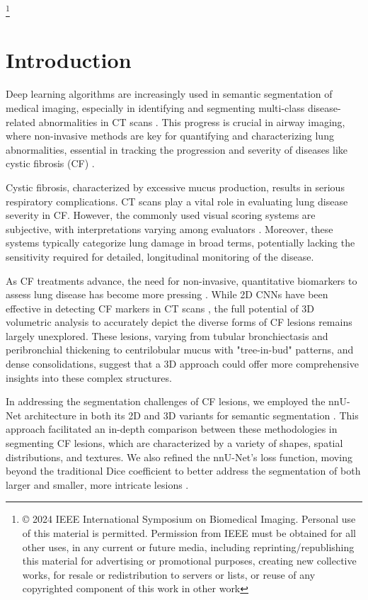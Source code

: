 \documentclass{article}
\newcommand\blfootnote[1]{%
  \begingroup
  \renewcommand\thefootnote{}\footnote{#1}%
  \addtocounter{footnote}{-1}%
  \endgroup
}
\begin{document}
\blfootnote{© 2024 IEEE International Symposium on Biomedical Imaging.  Personal use of this material is permitted.  Permission from IEEE must be obtained for all other uses, in any current or future media, including reprinting/republishing this material for advertising or promotional purposes, creating new collective works, for resale or redistribution to servers or lists, or reuse of any copyrighted component of this work in other work}
%
\section{Introduction}
\label{sec:intro}
Deep learning algorithms are increasingly used in semantic segmentation of medical imaging, especially in identifying and segmenting multi-class disease-related abnormalities in CT scans \cite{R2}. This progress is crucial in airway imaging, where non-invasive methods are key for quantifying and characterizing lung abnormalities, essential in tracking the progression and severity of diseases like cystic fibrosis (CF) \cite{R3}.

Cystic fibrosis, characterized by excessive mucus production, results in serious respiratory complications. CT scans play a vital role in evaluating lung disease severity in CF. However, the commonly used visual scoring systems are subjective, with interpretations varying among evaluators \cite{R6}. Moreover, these systems typically categorize lung damage in broad terms, potentially lacking the sensitivity required for detailed, longitudinal monitoring of the disease.

As CF treatments advance, the need for non-invasive, quantitative biomarkers to assess lung disease has become more pressing \cite{R4}. While 2D CNNs have been effective in detecting CF markers in CT scans \cite{R1}, the full potential of 3D volumetric analysis to accurately depict the diverse forms of CF lesions remains largely unexplored. These lesions, varying from tubular bronchiectasis and peribronchial thickening to centrilobular mucus with "tree-in-bud" patterns, and dense consolidations, suggest that a 3D approach could offer more comprehensive insights into these complex structures.

In addressing the segmentation challenges of CF lesions, we employed the nnU-Net architecture in both its 2D and 3D variants for semantic segmentation \cite{R7}. This approach facilitated an in-depth comparison between these methodologies in segmenting CF lesions, which are characterized by a variety of shapes, spatial distributions, and textures. We also refined the nnU-Net's loss function, moving beyond the traditional Dice coefficient to better address the segmentation of both larger and smaller, more intricate lesions \cite{R8}. 
\end{document}
